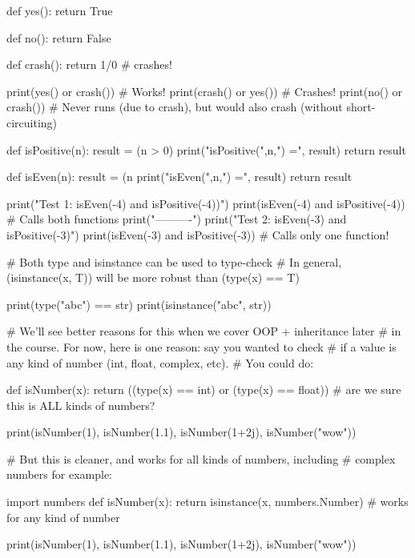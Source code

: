 \begin{runpython}[title={Once again, using the "or" operator}]
def yes():
    return True

def no():
    return False

def crash():
    return 1/0 # crashes!

print(yes() or crash()) # Works!
print(crash() or yes()) # Crashes!
print(no() or crash())  # Never runs (due to crash), but would also crash (without short-circuiting)
\end{runpython}

\begin{runpython}[title=Yet another example]
def isPositive(n):
    result = (n > 0)
    print("isPositive(",n,") =", result)
    return result

def isEven(n):
    result = (n %
    print("isEven(",n,") =", result)
    return result

print("Test 1: isEven(-4) and isPositive(-4))")
print(isEven(-4) and isPositive(-4)) # Calls both functions
print("----------")
print("Test 2: isEven(-3) and isPositive(-3)")
print(isEven(-3) and isPositive(-3)) # Calls only one function!
\end{runpython}

\begin{runpython}[title=type vs isinstance]
# Both type and isinstance can be used to type-check
# In general, (isinstance(x, T)) will be more robust than (type(x) == T)

print(type("abc") == str)
print(isinstance("abc", str))

# We'll see better reasons for this when we cover OOP + inheritance later
# in the course.  For now, here is one reason:  say you wanted to check
# if a value is any kind of number (int, float, complex, etc). 
# You could do:

def isNumber(x):
    return ((type(x) == int) or
            (type(x) == float)) # are we sure this is ALL kinds of numbers?

print(isNumber(1), isNumber(1.1), isNumber(1+2j), isNumber("wow"))

# But this is cleaner, and works for all kinds of numbers, including
# complex numbers for example:

import numbers
def isNumber(x):
    return isinstance(x, numbers.Number) # works for any kind of number

print(isNumber(1), isNumber(1.1), isNumber(1+2j), isNumber("wow"))
\end{runpython}
